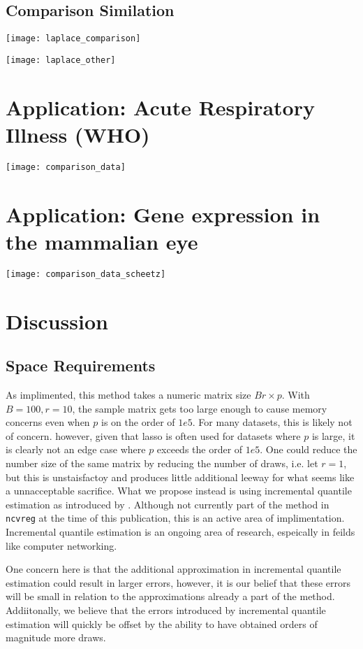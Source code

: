 \subsection{Comparison Similation}

\texttt{[image: laplace\_comparison]}

\texttt{[image: laplace\_other]}

\section{Application: Acute Respiratory Illness (WHO)}

\texttt{[image: comparison\_data]}

\section{Application: Gene expression in the mammalian eye}

\texttt{[image: comparison\_data\_scheetz]}

\section{Discussion}

\subsection{Space Requirements}

As implimented, this method takes a numeric matrix size $Br \times p$. With $B = 100, r = 10$, the sample matrix gets too large enough to cause memory concerns even when $p$ is on the order of $1e5$. For many datasets, this is likely not of concern. however, given that lasso is often used for datasets where $p$ is large, it is clearly not an edge case where $p$ exceeds the order of $1e5$. One could reduce the number size of the same matrix by reducing the number of draws, i.e. let $r = 1$, but this is unstaisfactoy and produces little additional leeway for what seems like a unnacceptable sacrifice. What we propose instead is using incremental quantile estimation as introduced by \cite{Tierney1983}. Although not currently part of the method in \texttt{ncvreg} at the time of this publication, this is an active area of implimentation. Incremental quantile estimation is an ongoing area of research, espeically in feilds like computer networking.

One concern here is that the additional approximation in incremental quantile estimation could result in larger errors, however, it is our belief that these errors will be small in relation to the approximations already a part of the method. Addiitonally, we believe that the errors introduced by incremental quantile estimation will quickly be offset by the ability to have obtained orders of magnitude more draws.

